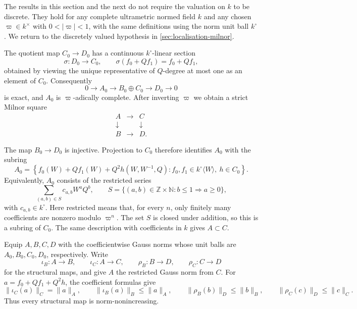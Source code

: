 \documentclass[11pt,reqno]{amsart}
\theoremstyle{definition}
\begin{document}
The results in this section and the next do not require the valuation on $k$
to be discrete.  They hold for any complete ultrametric normed field $k$ and
any chosen $\varpi\in k^\times$ with $0<|\varpi|<1$, with the same definitions
using the norm unit ball $k^\circ$.  We return to the discretely valued
hypothesis in \cref{sec:localisation-milnor}.

The quotient map $C_0\to D_0$ has a continuous $k^\circ$-linear section
\[
  \sigma:D_0\longrightarrow C_0,\qquad
  \sigma(f_0+Qf_1)=f_0+Qf_1,
\]
obtained by viewing the unique representative of $Q$-degree at most one as
an element of $C_0$.
Consequently
\[
  0\longrightarrow A_0\longrightarrow B_0\oplus C_0
  \longrightarrow D_0\longrightarrow 0
\]
is exact, and $A_0$ is $\varpi$-adically complete.  After inverting $\varpi$ we obtain a strict Milnor square
\[
\begin{matrix}
A&\longrightarrow&C\\
\downarrow&&\downarrow\\
B&\longrightarrow&D.
\end{matrix}
\]

The map $B_0\to D_0$ is injective.  Projection to $C_0$ therefore identifies $A_0$ with the subring
\begin{equation}\label{eq:coefficient-A0}
  A_0=
  \left\{
  f_0(W)+Qf_1(W)+Q^2h(W,W^{-1},Q):
  f_0,f_1\in k^\circ\langle W\rangle,
  \ h\in C_0
  \right\}.
\end{equation}
Equivalently, $A_0$ consists of the restricted series
\[
  \sum_{(a,b)\in S}c_{a,b}W^aQ^b,
  \qquad
  S=\{(a,b)\in\mathbb Z\times\mathbb N: b\leq 1\Rightarrow a\geq 0\},
\]
with $c_{a,b}\in k^\circ$.  Here restricted means that, for every $n$, only finitely many coefficients are nonzero modulo $\varpi^n$.  The set $S$ is closed under addition, so this is a subring of $C_0$.  The same description with coefficients in $k$ gives $A\subset C$.


Equip $A,B,C,D$ with the coefficientwise Gauss norms whose unit balls are
$A_0,B_0,C_0,D_0$, respectively.  Write
\[
  \iota_B:A\to B,\qquad \iota_C:A\to C,\qquad
  \rho_B:B\to D,\qquad \rho_C:C\to D
\]
for the structural maps, and give \(A\) the restricted Gauss norm from \(C\).  For
\(a=f_0+Qf_1+Q^2h\), the coefficient formulas give
\begin{equation}\label{eq:structural-map-bounds}
  \lVert\iota_C(a)\rVert_C=\lVert a\rVert_A,
  \qquad
  \lVert\iota_B(a)\rVert_B\leq \lVert a\rVert_A,
  \qquad
  \lVert\rho_B(b)\rVert_D\leq\lVert b\rVert_B,
  \qquad
  \lVert\rho_C(c)\rVert_D\leq\lVert c\rVert_C.
\end{equation}
Thus every structural map is norm-nonincreasing.
\end{document}
